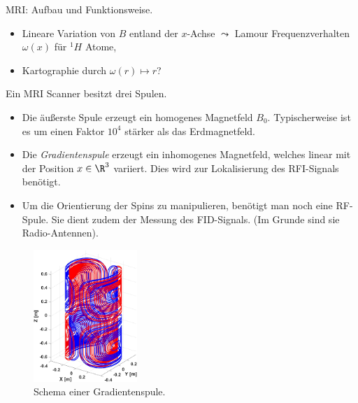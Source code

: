 \documentclass{subfiles}
\begin{document}
    \begin{Frage}
        MRI: Aufbau und Funktionsweise.
        \begin{itemize}[label=$\to$]
            \item Lineare Variation von $B$ entland der $x$-Achse $\leadsto$ Lamour Frequenzverhalten $\omega(x)$ für $^1H$ Atome,
            \item Kartographie durch $\omega(r)\mapsto r$?
        \end{itemize}
    \end{Frage}
    \begin{Antwort}
        Ein MRI Scanner besitzt drei Spulen. 
        \begin{itemize}[label=$\to$]
            \item Die äußerste Spule erzeugt ein homogenes Magnetfeld $B_0$. Typischerweise ist es um einen Faktor $10^4$ stärker als das Erdmagnetfeld.
            \item Die \emph{Gradientenspule} erzeugt ein inhomogenes Magnetfeld, welches linear mit der Position $x\in\R^3$ variiert. Dies wird zur Lokalisierung des RFI-Signals benötigt.
            \item Um die Orientierung der Spins zu manipulieren, benötigt man noch eine RF-Spule. Sie dient zudem der Messung des FID-Signals. (Im Grunde sind sie Radio-Antennen). 
        \end{itemize}
        \begin{figure}[H]
            \centering
            \includegraphics[height=5cm]{Bilddateien/GradientCoil.png}
            \caption{Schema einer Gradientenspule.}
        \end{figure}
    \end{Antwort}
\end{document}
